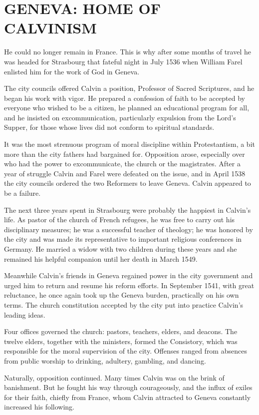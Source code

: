 \section{GENEVA: HOME OF CALVINISM}

He could no longer remain in France. This is why after some months of travel he was headed for
Strasbourg that fateful night in July 1536 when William Farel enlisted him for the work of God in
Geneva.

The city councils offered Calvin a position, Professor of Sacred Scriptures, and he began his work
with vigor. He prepared a confession of faith to be accepted by everyone who wished to be a citizen,
he planned an educational program for all, and he insisted on excommunication, particularly
expulsion from the Lord’s Supper, for those whose lives did not conform to spiritual standards.

It was the most strenuous program of moral discipline within Protestantism, a bit more than the city
fathers had bargained for. Opposition arose, especially over who had the power to excommunicate, the
church or the magistrates. After a year of struggle Calvin and Farel were defeated on the issue, and
in April 1538 the city councils ordered the two Reformers to leave Geneva. Calvin appeared to be a
failure.

The next three years spent in Strasbourg were probably the happiest in Calvin’s life. As pastor of
the church of French refugees, he was free to carry out his disciplinary measures; he was a
successful teacher of theology; he was honored by the city and was made its representative to
important religious conferences in Germany. He married a widow with two children during these years
and she remained his helpful companion until her death in March 1549.

Meanwhile Calvin’s friends in Geneva regained power in the city government and urged him to return
and resume his reform efforts. In September 1541, with great reluctance, he once again took up the
Geneva burden, practically on his own terms. The church constitution accepted by the city put into
practice Calvin’s leading ideas.

Four offices governed the church: pastors, teachers, elders, and deacons. The twelve elders,
together with the ministers, formed the Consistory, which was responsible for the moral supervision
of the city. Offenses ranged from absences from public worship to drinking, adultery, gambling, and
dancing.

Naturally, opposition continued. Many times Calvin was on the brink of banishment. But he fought his
way through courageously, and the influx of exiles for their faith, chiefly from France, whom Calvin
attracted to Geneva constantly increased his following.

